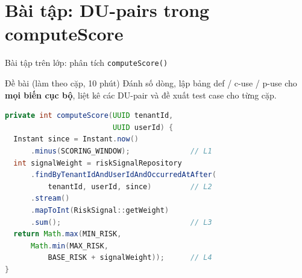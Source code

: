 \documentclass[aspectratio=169,12pt]{beamer}
\begin{document}
\section{Bài tập: DU-pairs trong computeScore}

\begin{frame}[fragile]{Bài tập trên lớp: phân tích \texttt{computeScore()}}
  \begin{block}{Đề bài (làm theo cặp, 10 phút)}
    \small Đánh số dòng, lập bảng def / c-use / p-use cho \textbf{mọi biến cục bộ},
    liệt kê các DU-pair và đề xuất test case cho từng cặp.
  \end{block}

\begin{lstlisting}[language=java,basicstyle=\ttfamily\scriptsize]
private int computeScore(UUID tenantId,
                         UUID userId) {
  Instant since = Instant.now()
      .minus(SCORING_WINDOW);              // L1
  int signalWeight = riskSignalRepository
      .findByTenantIdAndUserIdAndOccurredAtAfter(
          tenantId, userId, since)         // L2
      .stream()
      .mapToInt(RiskSignal::getWeight)
      .sum();                              // L3
  return Math.max(MIN_RISK,
      Math.min(MAX_RISK,
          BASE_RISK + signalWeight));      // L4
}
\end{lstlisting}
\end{frame}
\end{document}
